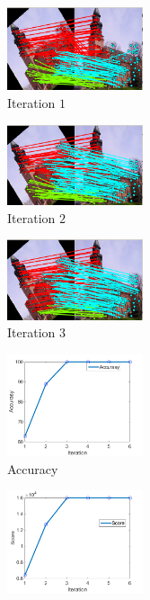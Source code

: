 \begin{figure} \centering
		\begin{subfigure}[b]{0.32\textwidth}
			\centering
			\includegraphics[width=4cm]{"chapter3/fig/ImageTrafo/sIterations/It1"} 
			\caption{Iteration $1$}
		\end{subfigure}
		\begin{subfigure}[b]{0.32\textwidth}
			\centering
			\includegraphics[width=4cm]{"chapter3/fig/ImageTrafo/sIterations/It2"} 
			\caption{Iteration $2$}
		\end{subfigure} 
		\begin{subfigure}[b]{0.32\textwidth}
			\centering
			\includegraphics[width=4cm]{"chapter3/fig/ImageTrafo/sIterations/It3"}
			\caption{Iteration $3$}
		\end{subfigure} 	
		\begin{subfigure}[b]{0.33\textwidth}
			\centering
			\includegraphics[width=4cm]{"chapter3/fig/ImageTrafo/sIterations/accuracy"}
			\caption{Accuracy}
			\label{fig:ImageTrafo_sIterations_d}
		\end{subfigure} 
		\begin{subfigure}[b]{0.33\textwidth}
			\centering
			\includegraphics[width=4cm]{"chapter3/fig/ImageTrafo/sIterations/score"}

\end{subfigure}
\end{figure}
